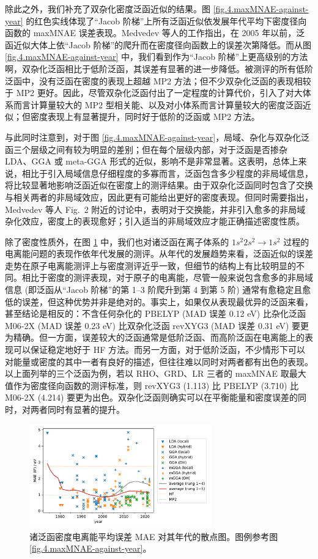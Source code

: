 除此之外，我们补充了双杂化密度泛函近似的结果。图 \ref{fig.4.maxMNAE-against-year} 的红色实线体现了“Jacob 阶梯”上所有泛函近似依发展年代平均下密度径向函数的 maxMNAE 误差表现。Medvedev 等人的工作指出，在 2005 年以前，泛函近似大体上依“Jacob 阶梯”的爬升而在密度径向函数上的误差次第降低。而从图 \ref{fig.4.maxMNAE-against-year} 中，我们看到作为“Jacob 阶梯”上更高级别的方法啊，双杂化泛函相比于低阶泛函，其误差有显著的进一步降低。被测评的所有低阶泛函中，没有泛函在密度的表现上超越 MP2 方法；但不少双杂化泛函的表现相较于 MP2 更好。因此，尽管双杂化泛函付出了一定程度的计算代价，引入了对大体系而言计算量较大的 MP2 型相关能、以及对小体系而言计算量较大的密度泛函近似；但密度表现上有显著提升，同时好于低阶的泛函或 MP2 方法。

与此同时注意到，对于图 \ref{fig.4.maxMNAE-against-year}，局域、杂化与双杂化泛函三个层级之间有较为明显的差别；但在每个层级内部，对于泛函是否掺杂 LDA、GGA 或 meta-GGA 形式的近似，影响不是非常显著。这表明，总体上来说，相比于引入局域信息仔细程度的多寡而言，泛函包含多少程度的非局域信息，将比较显著地影响泛函近似在密度上的测评结果。由于双杂化泛函同时包含了交换与相关两者的非局域效应，因此更有可能给出更好的密度表现。但同时需要指出，Medvedev 等人 Fig.\ 2 附近的讨论中，表明对于交换能，并非引入愈多的非局域杂化效应，密度上的表现愈好；引入适当的非局域效应才能正确描述密度性质。

除了密度性质外，在图 \ref{fig.4.MAE-etot-against-year} 中，我们也对诸泛函在离子体系的 $1s^2 2s^2 \rightarrow 1s^2$ 过程的电离能问题的表现作依年代发展的测评。从年代的发展趋势来看，泛函近似的误差走势在原子电离能测评上与密度测评近乎一致，但细节的结构上有比较明显的不同。相比于密度的测评表现，对于原子的电离能，尽管一般来说包含愈多的非局域信息 (即泛函从“Jacob 阶梯”的第 1--3 阶爬升到第 4 到第 5 阶) 通常有愈稳定且愈低的误差，但这种优势并非是绝对的。事实上，如果仅从表现最优异的泛函来看，甚至结论是相反的：不含任何杂化的 PBELYP (MAD 误差 0.12 eV) 比杂化泛函 M06-2X (MAD 误差 0.23 eV) 比双杂化泛函 revXYG3 (MAD 误差 0.31 eV) 要更为精确。但一方面，误差较大的泛函通常是低阶泛函、而高阶泛函在电离能上的表现可以保证稳定地好于 HF 方法。而另一方面，对于低阶泛函，不少情形下可以对能量或密度的其中一者有良好的描述，但往往难以同时对两者都有出色的表现。以上面列举的三个泛函为例，若以 RHO、GRD、LR 三者的 maxMNAE 取最大值作为密度径向函数的测评标准，则 revXYG3 (1.113) 比 PBELYP (3.710) 比 M06-2X (4.214) 要更为出色。双杂化泛函则确实可以在平衡能量和密度误差的同时，对两者同时有显著的提升。

\begin{figure}[t]
    \centering
    \includegraphics[width=0.7\textwidth]{assets/MAE-etot-against-year.pdf}
    \caption{诸泛函密度电离能平均误差 MAE 对其年代的散点图。图例参考图 \ref{fig.4.maxMNAE-against-year}。}
    \label{fig.4.MAE-etot-against-year}
\end{figure}

